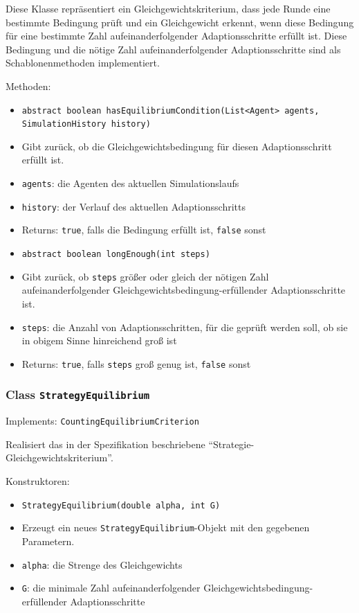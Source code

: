 \documentclass[parskip=full,11pt]{scrartcl}
\begin{document}
Diese Klasse repräsentiert ein Gleichgewichtskriterium, dass jede Runde eine bestimmte Bedingung prüft und ein Gleichgewicht erkennt, wenn diese Bedingung für eine bestimmte Zahl aufeinanderfolgender Adaptionsschritte erfüllt ist. Diese Bedingung und die nötige Zahl aufeinanderfolgender Adaptionsschritte sind als Schablonenmethoden implementiert.

Methoden:
\begin{itemize}\itemsep -10pt
\item \texttt{abstract boolean hasEquilibriumCondition(List<Agent> agents, SimulationHistory history)}
\item[] Gibt zurück, ob die Gleichgewichtsbedingung für diesen Adaptionsschritt erfüllt ist.
\item[] \texttt{agents}: die Agenten des aktuellen Simulationslaufs
\item[] \texttt{history}: der Verlauf des aktuellen Adaptionsschritts
\item[] Returns: \texttt{true}, falls die Bedingung erfüllt ist, \texttt{false} sonst

\item \texttt{abstract boolean longEnough(int steps)}
\item[] Gibt zurück, ob \texttt{steps} größer oder gleich der nötigen Zahl aufeinanderfolgender Gleichgewichtsbedingung-erfüllender Adaptionsschritte ist.
\item[] \texttt{steps}: die Anzahl von Adaptionsschritten, für die geprüft werden soll, ob sie in obigem Sinne hinreichend groß ist
\item[] Returns: \texttt{true}, falls \texttt{steps} groß genug ist, \texttt{false} sonst
\end{itemize}

\subsubsection{Class \texttt{StrategyEquilibrium}}
Implements: \texttt{CountingEquilibriumCriterion}

Realisiert das in der Spezifikation beschriebene \enquote{Strategie-Gleichgewichtskriterium}.

Konstruktoren:
\begin{itemize}\itemsep -10pt
\item \texttt{StrategyEquilibrium(double alpha, int G)}
\item[] Erzeugt ein neues \texttt{StrategyEquilibrium}-Objekt mit den gegebenen Parametern.
\item[] \texttt{alpha}: die Strenge des Gleichgewichts
\item[] \texttt{G}: die minimale Zahl aufeinanderfolgender Gleichgewichtsbedingung-erfüllender Adaptionsschritte
\end{itemize}
\end{document}
